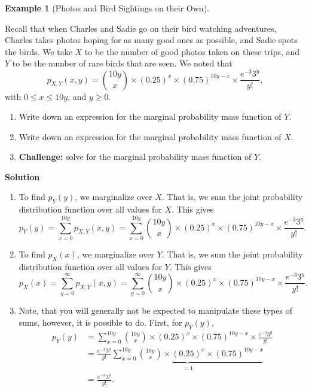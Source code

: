 \documentclass[
  letterpaper,
  DIV=11,
  numbers=noendperiod]{scrreprt}
\providecommand{\tightlist}{%
  \setlength{\itemsep}{0pt}\setlength{\parskip}{0pt}}\usepackage{longtable,booktabs,array}
\theoremstyle{definition}
\theoremstyle{definition}
\theoremstyle{definition}
\newtheorem{example}{Example}[chapter]
\theoremstyle{remark}
\begin{document}
\begin{example}[Photos and Bird Sightings on their
Own]\protect\hypertarget{exm-conditioning}{}\label{exm-conditioning}

Recall that when Charles and Sadie go on their bird watching adventures,
Charles takes photos hoping for as many good ones as possible, and Sadie
spots the birds. We take \(X\) to be the number of good photos taken on
these trips, and \(Y\) to be the number of rare birds that are seen. We
noted that
\[p_{X,Y}(x, y) = \binom{10y}{x}\times(0.25)^{x}\times(0.75)^{10y - x}\times\frac{e^{-3}3^y}{y!},\]
with \(0 \leq x \leq 10y\), and \(y \geq 0\).

\begin{enumerate}
\def\labelenumi{\alph{enumi}.}
\tightlist
\item
  Write down an expression for the marginal probability mass function of
  \(Y\).
\item
  Write down an expression for the marginal probability mass function of
  \(X\).
\item
  \textbf{Challenge:} solve for the marginal probability mass function
  of \(Y\).
\end{enumerate}

\begin{tcolorbox}[enhanced jigsaw, colback=white, breakable, rightrule=.15mm, leftrule=.75mm, toprule=.15mm, left=2mm, arc=.35mm, opacityback=0, bottomrule=.15mm]

\vspace{-3mm}\textbf{Solution}\vspace{3mm}

\begin{enumerate}
\def\labelenumi{\alph{enumi}.}
\item
  To find \(p_Y(y)\), we marginalize over \(X\). That is, we sum the
  joint probability distribution function over all values for \(X\).
  This gives
  \[p_Y(y) = \sum_{x = 0}^{10y} p_{X,Y}(x, y) = \sum_{x = 0}^{10y} \binom{10y}{x}\times(0.25)^{x}\times(0.75)^{10y - x}\times\frac{e^{-3}3^y}{y!}.\]
\item
  To find \(p_X(x)\), we marginalize over \(Y\). That is, we sum the
  joint probability distribution function over all values for \(Y\).
  This gives
  \[p_X(x) = \sum_{y = 0}^{\infty} p_{X,Y}(x, y) = \sum_{y = 0}^{\infty} \binom{10y}{x}\times(0.25)^{x}\times(0.75)^{10y - x}\times\frac{e^{-3}3^y}{y!}.\]
\item
  Note, that you will generally not be expected to manipulate these
  types of sums, however, it is possible to do. First, for \(p_Y(y)\),
  \begin{align*}
  p_Y(y) &= \sum_{x = 0}^{10y} \binom{10y}{x}\times(0.25)^{x}\times(0.75)^{10y - x}\times\frac{e^{-3}3^y}{y!} \\
  &= \frac{e^{-3}3^y}{y!}\underbrace{\sum_{x = 0}^{10y} \binom{10y}{x}\times(0.25)^{x}\times(0.75)^{10y - x}}_{=1} \\
  &= \frac{e^{-3}3^y}{y!}.
  \end{align*}
\end{enumerate}

\end{tcolorbox}

\end{example}
\end{document}
